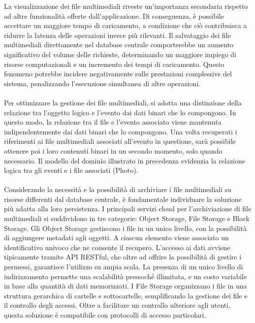 La visualizzazione dei file multimediali riveste un'importanza secondaria rispetto ad altre funzionalità offerte dall'applicazione. 
Di conseguenza, è possibile accettare un maggiore tempo di caricamento, a condizione che ciò contribuisca a ridurre la latenza delle operazioni invece più rilevanti. 
Il salvataggio dei file multimediali direttamente nel database centrale comporterebbe un aumento significativo del volume delle richieste, 
determinando un maggiore impiego di risorse computazionali e un incremento dei tempi di caricamento. 
Questo fenomeno potrebbe incidere negativamente sulle prestazioni complessive del sistema, penalizzando l’esecuzione simultanea di altre operazioni.\\
\\
Per ottimizzare la gestione dei file multimediali, si adotta una distinzione della relazione tra l’oggetto logico e l'evento dai dati binari che lo compongono. 
In questo modo, la relazione tra il file e l’evento associato viene mantenuta indipendentemente dai dati binari che lo compongono. 
Una volta recuperati i riferimenti ai file multimediali associati all’evento in questione, sarà possibile ottenere poi i loro contenuti binari in un secondo momento, solo quando necessario.
Il modello del dominio illustrato in precedenza evidenzia la relazione logica tra gli eventi e i file associati (Photo).\\
\\
Considerando la necessità e la possibilità di archiviare i file multimediali su risorse differenti dal database centrale, 
è fondamentale individuare la soluzione più adatta alla loro persistenza. 
I principali servizi cloud per l’archiviazione di file multimediali si suddividono in tre categorie: Object Storage, File Storage e Block Storage.
Gli Object Storage gestiscono i file in un unico livello, con la possibilità di aggiungere metadati agli oggetti. 
A ciascun elemento viene associato un identificativo univoco che ne consente il recupero. 
L’accesso ai dati avviene tipicamente tramite API RESTful, che oltre ad offrire la possibilità di gestire i permessi, garantisce l’utilizzo su ampia scala. 
La presenza di un unico livello di indirizzamento permette una scalabilità pressoché illimitata, e un costo variabile in base alla quantità di dati memorizzati.
I File Storage organizzano i file in una struttura gerarchica di cartelle e sottocartelle, semplificando la gestione dei file e il controllo degli accessi. 
Oltre a facilitare un controllo ulteriore agli utenti, questa soluzione è compatibile con protocolli di accesso particolari. 
